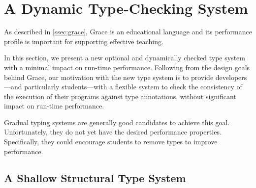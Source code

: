 
\section{A Dynamic Type-Checking System}
\label{sec:method}




As described in \cref{ssec:grace},
Grace is an educational language and its performance profile
is important for supporting effective teaching. 

In this section,
we present a new optional and dynamically checked type system
with a minimal impact on run-time performance.
Following from the design goals behind Grace,
our motivation with the new type system
is to provide developers---and particularly students---with a flexible system 
to check the consistency of the execution of their programs
against type annotations,
without significant impact on run-time performance.

Gradual typing systems are generally good candidates to achieve this goal.
Unfortunately, they do not yet have the desired performance properties\citep{Takikawa2016}.
Specifically, they could encourage students to remove types
to improve performance.





\subsection{A Shallow Structural Type System}

